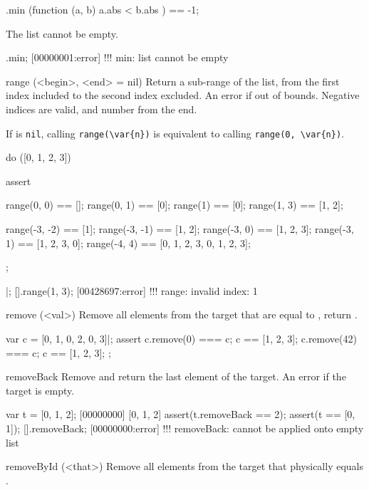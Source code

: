 \begin{urbiscriptapi}
\begin{urbiassert}
[2, -1, 3, -4].min (function (a, b) { a.abs < b.abs }) == -1;
\end{urbiassert}

The list cannot be empty.

\begin{urbiscript}
[].min;
[00000001:error] !!! min: list cannot be empty
\end{urbiscript}

\item[range](<begin>, <end> = nil)%
  Return a sub-range of the list, from the first index included to the
  second index excluded.  An error if out of bounds.  Negative indices
  are valid, and number from the end.

  If  is \lstinline|nil|, calling \lstinline|range(\var{n})|
  is equivalent to calling \lstinline|range(0, \var{n})|.

\begin{urbiscript}
do ([0, 1, 2, 3])
{
  assert
  {
    range(0, 0)   == [];
    range(0, 1)   == [0];
    range(1)      == [0];
    range(1, 3)   == [1, 2];

    range(-3, -2) == [1];
    range(-3, -1) == [1, 2];
    range(-3, 0)  == [1, 2, 3];
    range(-3, 1)  == [1, 2, 3, 0];
    range(-4, 4)  == [0, 1, 2, 3, 0, 1, 2, 3];
  };
}|;
[].range(1, 3);
[00428697:error] !!! range: invalid index: 1
\end{urbiscript}

\item[remove](<val>)%
  Remove all elements from the target that are equal to , return
  \this.

\begin{urbiscript}
var c = [0, 1, 0, 2, 0, 3]|;
assert
{
  c.remove(0) === c;   c ==  [1, 2, 3];
  c.remove(42) === c;  c ==  [1, 2, 3];
};
\end{urbiscript}

\item[removeBack]
  Remove and return the last element of the target. An error if the
  target is empty.

\begin{urbiscript}
var t = [0, 1, 2];
[00000000] [0, 1, 2]
assert(t.removeBack == 2);
assert(t == [0, 1]);
[].removeBack;
[00000000:error] !!! removeBack: cannot be applied onto empty list
\end{urbiscript}

\item[removeById](<that>)%
  Remove all elements from the target that physically equals
  .


\end{urbiscriptapi}
